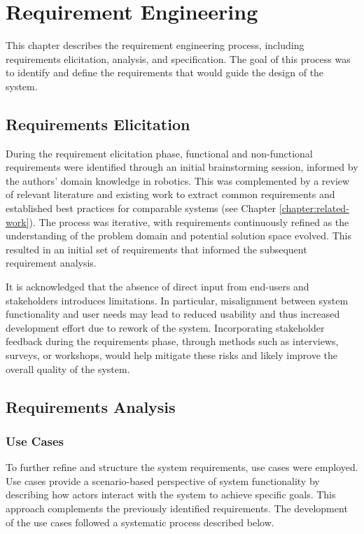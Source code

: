 \chapter{Requirement Engineering}
This chapter describes the requirement engineering process, including requirements elicitation, analysis, and specification. The goal of this process was to identify and define the requirements that would guide the design of the system.


\section{Requirements Elicitation}
During the requirement elicitation phase, functional and non-functional requirements were identified through an initial brainstorming session, informed by the authors' domain knowledge in robotics. This was complemented by a review of relevant literature and existing work to extract common requirements and established best practices for comparable systems (see Chapter \ref{chapter:related-work}). The process was iterative, with requirements continuously refined as the understanding of the problem domain and potential solution space evolved. This resulted in an initial set of requirements that informed the subsequent requirement analysis.

It is acknowledged that the absence of direct input from end-users and stakeholders introduces limitations. In particular, misalignment between system functionality and user needs may lead to reduced usability and thus increased development effort due to rework of the system. Incorporating stakeholder feedback during the requirements phase, through methods such as interviews, surveys, or workshops, would help mitigate these risks and likely improve the overall quality of the system.


\section{Requirements Analysis}
\subsection{Use Cases}
To further refine and structure the system requirements, use cases were employed. Use cases provide a scenario-based perspective of system functionality by describing how actors interact with the system to achieve specific goals. This approach complements the previously identified requirements. The development of the use cases followed a systematic process described below.

